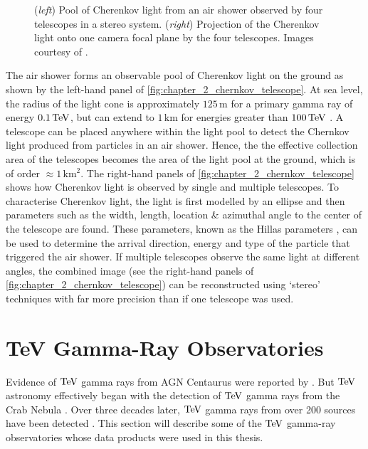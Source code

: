 \begin{figure}[h]
    \caption{(\textit{left}) Pool of Cherenkov light from an air shower observed by four telescopes in a stereo system.
    (\textit{right}) Projection of the Cherenkov light onto one camera focal plane by the four telescopes. Images courtesy of \cite{2009ExA....25..173V,}.}
    \label{fig:chapter_2_chernkov_telescope}
\end{figure}
\newpar
The air shower forms an observable pool of Cherenkov light on the ground as shown by the left-hand panel of \autoref{fig:chapter_2_chernkov_telescope}. At sea level, the radius of the light cone is approximately $125\,\si{\meter}$ for a primary gamma ray of energy $0.1\,\TeV$, but can extend to $1\,\si{\kilo\meter}$ for energies greater than $100\,\TeV$ \citep{Patterson_1983}.  A telescope can be placed anywhere within the light pool to detect the Chernkov light produced from particles in an air shower. Hence, the the effective collection area of the telescopes becomes the area of the light pool at the ground, which is of order $\approx1\,\si{\kilo\meter\squared}$.
\newpar
The right-hand panels of \autoref{fig:chapter_2_chernkov_telescope} shows how Cherenkov light is observed by single and multiple telescopes. To characterise Cherenkov light, the light is first modelled by an ellipse and then parameters such as the width, length, location \& azimuthal angle to the center of the telescope are found. These parameters, known as the Hillas parameters \citep{1985ICRC....3..445H}, can be used to determine the arrival direction, energy and type of the particle that triggered the air shower. If multiple telescopes observe the same light at different angles, the combined image (see the right-hand panels of \autoref{fig:chapter_2_chernkov_telescope}) can be reconstructed using `stereo' techniques with far more precision than if one telescope was used.

\section{TeV Gamma-Ray Observatories} \label{sec:02_TeV_observatories}

Evidence of $\TeV$ gamma rays from AGN Centaurus were reported by \cite{1975ApJ...197L...9G}. But $\TeV$ astronomy effectively began with the detection of $\TeV$ gamma rays from the Crab Nebula \citep{1989ApJ...342..379W}. Over three decades later, $\TeV$ gamma rays from over 200 sources have been detected \citep{2008ICRC....3.1341W}. This section will describe some of the $\TeV$ gamma-ray observatories whose data products were used in this thesis.

